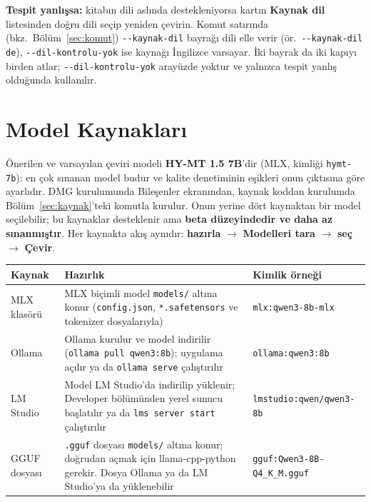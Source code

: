 \documentclass[11pt,a4paper]{article}
\newcommand{\dugme}[1]{\textsf{\bfseries #1}}
\newcommand{\dosya}[1]{\texttt{#1}}
\begin{document}
\begin{notkutu}
\textbf{Tespit yanlışsa:} kitabın dili aslında destekleniyorsa kartın
\dugme{Kaynak dil} listesinden doğru dili seçip yeniden çevirin. Komut
satırında (bkz.\ Bölüm~\ref{sec:komut}) \dosya{-{}-kaynak-dil} bayrağı dili
elle verir (ör.\ \dosya{-{}-kaynak-dil de}), \dosya{-{}-dil-kontrolu-yok} ise
kaynağı İngilizce varsayar. İki bayrak da iki kapıyı birden atlar;
\dosya{-{}-dil-kontrolu-yok} arayüzde yoktur ve yalnızca tespit yanlış
olduğunda kullanılır.
\end{notkutu}

\section{Model Kaynakları}\label{sec:modeller}

Önerilen ve varsayılan çeviri modeli \textbf{HY-MT 1.5 7B}'dir (MLX, kimliği
\dosya{hymt-7b}): en çok sınanan model budur ve kalite denetiminin eşikleri
onun çıktısına göre ayarlıdır. DMG kurulumunda Bileşenler ekranından, kaynak
koddan kurulumda Bölüm~\ref{sec:kaynak}'teki komutla kurulur. Onun yerine dört
kaynaktan bir model seçilebilir; bu kaynaklar desteklenir ama \textbf{beta
düzeyindedir ve daha az sınanmıştır}. Her kaynakta akış aynıdır:
\textbf{hazırla} \(\rightarrow\) \dugme{Modelleri tara} \(\rightarrow\)
\textbf{seç} \(\rightarrow\) \dugme{Çevir}.

\vspace{6pt}
\renewcommand{\arraystretch}{1.35}
\noindent\begin{tabular}{@{}L{2.6cm}L{7.6cm}L{5.0cm}@{}}
\toprule
\textbf{Kaynak} & \textbf{Hazırlık} & \textbf{Kimlik örneği} \\
\midrule
MLX klasörü & MLX biçimli model \dosya{models/} altına konur
(\dosya{config.json}, \dosya{*.safetensors} ve tokenizer dosyalarıyla) &
\dosya{mlx:qwen3-8b-mlx} \\
Ollama & Ollama kurulur ve model indirilir (\dosya{ollama pull qwen3:8b});
uygulama açılır ya da \dosya{ollama serve} çalıştırılır &
\dosya{ollama:qwen3:8b} \\
LM Studio & Model LM Studio'da indirilip yüklenir; Developer bölümünden yerel
sunucu başlatılır ya da \dosya{lms server start} çalıştırılır &
\dosya{lmstudio:qwen/\allowbreak qwen3-8b} \\
GGUF dosyası & \dosya{.gguf} dosyası \dosya{models/} altına konur; doğrudan
açmak için llama-cpp-python gerekir. Dosya Ollama ya da LM Studio'ya da
yüklenebilir & \dosya{gguf:Qwen3-8B-\allowbreak Q4\_K\_M.gguf} \\
\bottomrule
\end{tabular}
\vspace{8pt}
\end{document}
